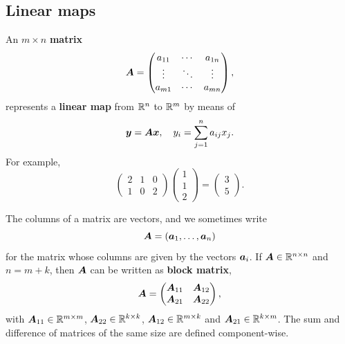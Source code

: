 \subsection{Linear maps}
An $m\times n$ \textbf{matrix} 
\begin{equation*}
\bm{A} = \begin{pmatrix} a_{11} & \cdots & a_{1n}\\
                    \vdots & \ddots & \vdots\\
                    a_{m1} & \cdots & a_{mn}
\end{pmatrix},
\end{equation*}
represents a \textbf{linear map} from $\mathbb{R}^n$ to $\mathbb{R}^m$ by means of
\begin{equation*}
\bm{y}= \bm{A}\bm{x}, \quad y_i = \sum_{j=1}^n a_{ij}x_j. 
\end{equation*}
For example,
\begin{equation*}
\begin{pmatrix}
2 & 1 & 0\\
1 & 0 & 2
\end{pmatrix}\begin{pmatrix}
1\\1\\2
\end{pmatrix} = 
\begin{pmatrix}
3\\5
\end{pmatrix}.
\end{equation*}

The columns of a matrix are vectors, and we sometimes write
\begin{equation*}
 \bm{A} = (\bm{a}_1,\dots,\bm{a}_n)
\end{equation*}
for the matrix whose columns are given by the vectors $\bm{a}_i$. 
If $\bm{A}\in \mathbb{R}^{n\times n}$ and $n=m+k$, then $\bm{A}$ can be written as \textbf{block matrix},
\begin{equation*}
 \bm{A} = \begin{pmatrix} 
  \bm{A}_{11} & \bm{A}_{12}\\
  \bm{A}_{21} & \bm{A}_{22}
 \end{pmatrix},
\end{equation*}
with $\bm{A}_{11}\in \mathbb{R}^{m\times m}$, $\bm{A}_{22}\in \mathbb{R}^{k\times k}$, $\bm{A}_{12}\in \mathbb{R}^{m\times k}$ and $\bm{A}_{21}\in \mathbb{R}^{k\times m}$. The sum and difference of matrices of the same size are defined component-wise. 

